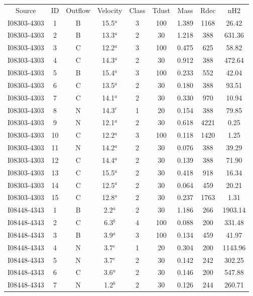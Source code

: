 \begin{table}
\begin{tabular}{ccccccccc}
Source & ID & Outflow & Velocity & Class & Tdust & Mass & Rdec & nH2 \\
I08303-4303 & 1 & B & 15.5$^{a}$ & 3 & 100 & 1.389 & 1168 & 26.42 \\
I08303-4303 & 2 & B & 13.3$^{a}$ & 2 & 30 & 1.218 & 388 & 631.36 \\
I08303-4303 & 3 & C & 12.2$^{a}$ & 3 & 100 & 0.475 & 625 & 58.82 \\
I08303-4303 & 4 & C & 14.3$^{a}$ & 2 & 30 & 0.912 & 388 & 472.64 \\
I08303-4303 & 5 & B & 15.4$^{a}$ & 3 & 100 & 0.233 & 552 & 42.04 \\
I08303-4303 & 6 & C & 13.5$^{a}$ & 2 & 30 & 0.180 & 388 & 93.51 \\
I08303-4303 & 7 & C & 14.1$^{a}$ & 2 & 30 & 0.330 & 970 & 10.94 \\
I08303-4303 & 8 & N & 14.3$^{e}$ & 1 & 20 & 0.154 & 388 & 79.85 \\
I08303-4303 & 9 & N & 12.1$^{a}$ & 2 & 30 & 0.618 & 4221 & 0.25 \\
I08303-4303 & 10 & C & 12.2$^{a}$ & 3 & 100 & 0.118 & 1420 & 1.25 \\
I08303-4303 & 11 & N & 14.2$^{a}$ & 2 & 30 & 0.076 & 388 & 39.29 \\
I08303-4303 & 12 & C & 14.4$^{a}$ & 2 & 30 & 0.139 & 388 & 71.90 \\
I08303-4303 & 13 & C & 15.5$^{a}$ & 2 & 30 & 0.418 & 918 & 16.34 \\
I08303-4303 & 14 & C & 12.5$^{a}$ & 2 & 30 & 0.064 & 459 & 20.21 \\
I08303-4303 & 15 & C & 12.8$^{a}$ & 2 & 30 & 0.237 & 1763 & 1.31 \\
I08448-4343 & 1 & B & 2.2$^{a}$ & 2 & 30 & 1.186 & 266 & 1903.14 \\
I08448-4343 & 2 & C & 6.3$^{b}$ & 4 & 100 & 0.088 & 200 & 331.48 \\
I08448-4343 & 3 & B & 3.9$^{a}$ & 3 & 100 & 0.134 & 459 & 41.97 \\
I08448-4343 & 4 & N & 3.7$^{e}$ & 1 & 20 & 0.304 & 200 & 1143.96 \\
I08448-4343 & 5 & N & 3.7$^{e}$ & 2 & 30 & 0.142 & 242 & 302.25 \\
I08448-4343 & 6 & C & 3.6$^{a}$ & 2 & 30 & 0.146 & 200 & 547.88 \\
I08448-4343 & 7 & N & 1.2$^{b}$ & 2 & 30 & 0.126 & 244 & 260.71 \\

\end{tabular}
\end{table}
